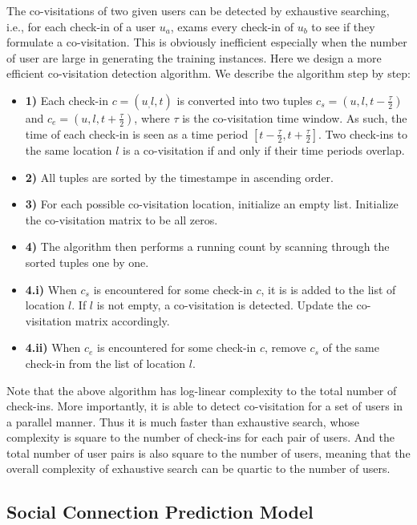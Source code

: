  The co-visitations of two given users can be detected by exhaustive searching, i.e., for each check-in of a user $u_a$, exams every check-in of $u_b$ to see if they formulate a co-visitation. This is obviously inefficient especially when the number of user are large in generating the training instances. Here we design a more efficient co-visitation detection algorithm. We describe the algorithm step by step:
\begin{itemize}[leftmargin=*]
\item \textbf{1)} Each check-in $c = (u_, l, t)$ is converted into two tuples $c_s = (u, l, t- \frac{\tau}{2})$ and $c_e = (u, l, t+\frac{\tau}{2})$, where $\tau$ is the co-visitation time window. As such, the time of each check-in is seen as a time period $[t - \frac{\tau}{2}, t + \frac{\tau}{2}]$. Two check-ins to the same location $l$ is a co-visitation if and only if their time periods overlap.
\item \textbf{2)} All tuples are sorted by the timestampe in ascending order.
\item \textbf{3)} For each possible co-visitation location, initialize an empty list. Initialize the co-visitation matrix to be all zeros.
\item \textbf{4)} The algorithm then performs a running count by scanning through the sorted tuples one by one.
\item \textbf{4.i)} When $c_s$ is encountered for some check-in $c$, it is is added to the list of location $l$. If $l$ is not empty, a co-visitation is detected. Update the co-visitation matrix accordingly.
\item \textbf{4.ii)} When $c_e$ is encountered for some check-in $c$, remove $c_s$ of the same check-in from the list of location $l$.
\end{itemize} 
Note that the above algorithm has log-linear complexity to the total number of check-ins. More importantly, it is able to detect co-visitation for a set of users in a parallel manner. Thus it is much faster than exhaustive search, whose complexity is square to the number of check-ins for each pair of users. And the total number of user pairs is also square to the number of users, meaning that the overall complexity of exhaustive search can be quartic to the number of users.



\subsection{Social Connection Prediction Model}


